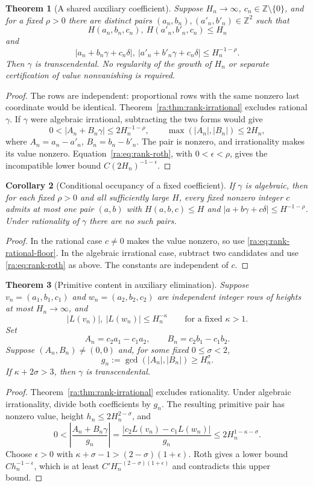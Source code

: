 \documentclass[11pt,a4paper]{article}
\newcommand{\Z}{\mathbb Z}
\newtheorem{theorem}{Theorem}[section]
\newtheorem{corollary}[theorem]{Corollary}
\theoremstyle{definition}
\theoremstyle{remark}
\theoremstyle{plain}
\numberwithin{equation}{section}
\begin{document}
\begin{theorem}[A shared auxiliary coefficient]
\label{ra:thm:rank-shared-c}
Suppose $H_n\to\infty$, $c_n\in\Z\setminus\{0\}$, and for a fixed
$\rho>0$ there are distinct pairs
$(a_n,b_n),(a'_n,b'_n)\in\Z^2$ such that
\[
 H(a_n,b_n,c_n),\ H(a'_n,b'_n,c_n)\le H_n
\]
and
\[
 |a_n+b_n\gamma+c_n\delta|,
 \ |a'_n+b'_n\gamma+c_n\delta|\le H_n^{-1-\rho}.
\]
Then $\gamma$ is transcendental.  No regularity of the growth of $H_n$
or separate certification of value nonvanishing is required.
\end{theorem}
\begin{proof}
The rows are independent: proportional rows with the same nonzero last
coordinate would be identical.  Theorem~\ref{ra:thm:rank-irrational}
excludes rational $\gamma$.  If $\gamma$ were algebraic irrational,
subtracting the two forms would give
\[
 0<|A_n+B_n\gamma|\le2H_n^{-1-\rho},\qquad
 \max(|A_n|,|B_n|)\le2H_n,
\]
where $A_n=a_n-a'_n$, $B_n=b_n-b'_n$.  The pair is nonzero, and
irrationality makes its value nonzero.  Equation~\eqref{ra:eq:rank-roth},
with $0<\epsilon<\rho$, gives the incompatible lower bound
$C(2H_n)^{-1-\epsilon}$.
\end{proof}

\begin{corollary}[Conditional occupancy of a fixed coefficient]
If $\gamma$ is algebraic, then for each fixed $\rho>0$ and all
sufficiently large $H$, every fixed nonzero integer $c$ admits at most
one pair $(a,b)$ with $H(a,b,c)\le H$ and
$|a+b\gamma+c\delta|\le H^{-1-\rho}$.  Under rationality of $\gamma$
there are no such pairs.
\end{corollary}
\begin{proof}
In the rational case $c\ne0$ makes the value nonzero, so use
\eqref{ra:eq:rank-rational-floor}.  In the algebraic irrational case,
subtract two candidates and use \eqref{ra:eq:rank-roth} as above.  The
constants are independent of $c$.
\end{proof}

\begin{theorem}[Primitive content in auxiliary elimination]
\label{ra:thm:rank-content}
Suppose $v_n=(a_1,b_1,c_1)$ and $w_n=(a_2,b_2,c_2)$ are independent
integer rows of heights at most $H_n\to\infty$, and
\[
 |L(v_n)|,\ |L(w_n)|\le H_n^{-\kappa}
 \qquad\text{for a fixed }\kappa>1.
\]
Set
\[
 A_n=c_2a_1-c_1a_2,\qquad B_n=c_2b_1-c_1b_2.
\]
Suppose $(A_n,B_n)\ne(0,0)$ and, for some fixed $0\le\sigma<2$,
\[
 g_n:=\gcd(|A_n|,|B_n|)\ge H_n^\sigma.
\]
If $\kappa+2\sigma>3$, then $\gamma$ is transcendental.
\end{theorem}
\begin{proof}
Theorem~\ref{ra:thm:rank-irrational} excludes rationality.  Under algebraic
irrationality, divide both coefficients by $g_n$.  The resulting primitive
pair has nonzero value, height $h_n\le2H_n^{2-\sigma}$, and
\[
 0<\left|\frac{A_n+B_n\gamma}{g_n}\right|
 =\frac{|c_2L(v_n)-c_1L(w_n)|}{g_n}
 \le2H_n^{1-\kappa-\sigma}.
\]
Choose $\epsilon>0$ with
$\kappa+\sigma-1>(2-\sigma)(1+\epsilon)$.
Roth gives a lower bound $C h_n^{-1-\epsilon}$, which is at least
$C' H_n^{-(2-\sigma)(1+\epsilon)}$ and contradicts this upper bound.
\end{proof}
\end{document}
